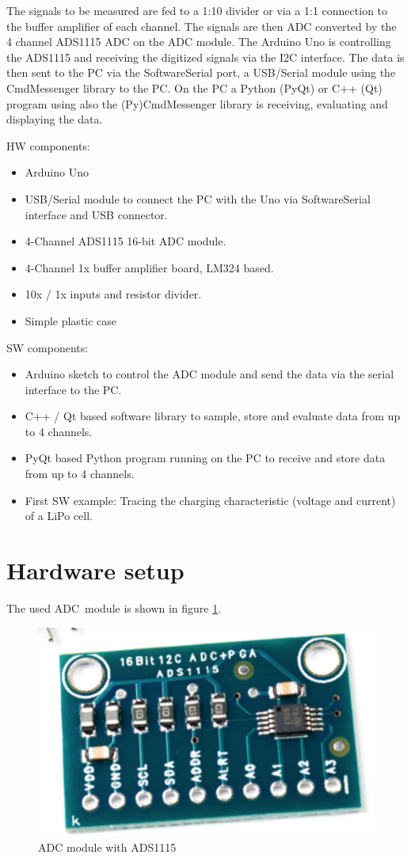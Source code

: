 \documentclass[11pt, oneside]{scrartcl}   	%
\begin{document}
The signals to be measured are fed to a 1:10 divider or via a 1:1 connection to the buffer amplifier of each channel.
The signals are then ADC converted by the 4 channel ADS1115 ADC on the ADC module.
The Arduino Uno is controlling the ADS1115 and receiving the digitized signals via the I2C interface.
The data is then sent to the PC via the SoftwareSerial port, a USB/Serial module using the CmdMessenger library to the PC.
On the PC a Python (PyQt) or C++ (Qt) program using also the (Py)CmdMessenger library is receiving, evaluating and displaying the data.

HW components:
\begin{itemize}
	\item Arduino Uno
	\item USB/Serial module to connect the PC with the Uno via SoftwareSerial interface and USB connector.
	\item 4-Channel ADS1115 16-bit ADC module.
	\item 4-Channel 1x buffer amplifier board, LM324 based.
	\item 10x / 1x inputs and resistor divider.
	\item Simple plastic case
\end{itemize}

SW components:
\begin{itemize}
	\item Arduino sketch to control the ADC module and send the data via the serial interface to the PC.
	\item C++ / Qt based software library to sample, store and evaluate data from up to 4 channels.
	\item PyQt based Python program running on the PC to receive and store data from up to 4 channels.
	\item First SW example: Tracing the charging characteristic (voltage and current) of a LiPo cell.
\end{itemize}

\section{Hardware setup}
The used ADC module is shown in figure \ref{fig:HWSetup}.
\begin{figure}[htbp]
	\centering
	\label{fig:HWSetup}
	\includegraphics[width=1.0\linewidth]{Figures/ADS1115ADCBoard.png}
	\caption{ADC module with ADS1115}
\end{figure}
\end{document}
